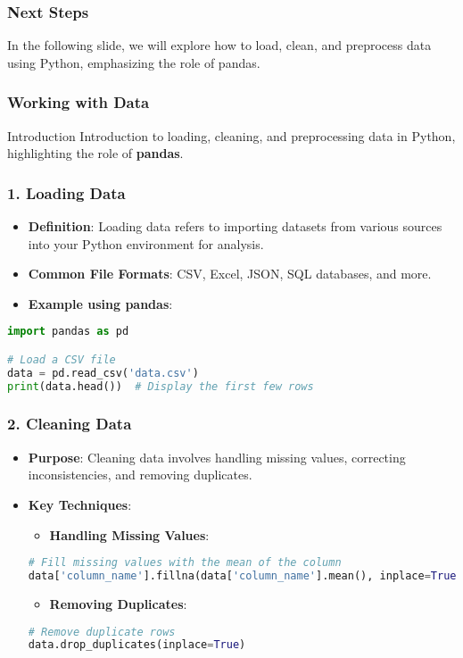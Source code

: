 \documentclass{beamer}
\begin{document}
\begin{frame}
    \frametitle{Next Steps}
    In the following slide, we will explore how to load, clean, and preprocess data using Python, emphasizing the role of pandas.
\end{frame}

\begin{frame}[fragile]
    \frametitle{Working with Data}
    \begin{block}{Introduction}
        Introduction to loading, cleaning, and preprocessing data in Python, highlighting the role of \textbf{pandas}.
    \end{block}
\end{frame}

\begin{frame}[fragile]
    \frametitle{1. Loading Data}
    \begin{itemize}
        \item \textbf{Definition}: Loading data refers to importing datasets from various sources into your Python environment for analysis.
        \item \textbf{Common File Formats}: CSV, Excel, JSON, SQL databases, and more.
        \item \textbf{Example using pandas}:
    \end{itemize}
    \begin{lstlisting}[language=Python]
import pandas as pd

# Load a CSV file
data = pd.read_csv('data.csv')
print(data.head())  # Display the first few rows
    \end{lstlisting}
\end{frame}

\begin{frame}[fragile]
    \frametitle{2. Cleaning Data}
    \begin{itemize}
        \item \textbf{Purpose}: Cleaning data involves handling missing values, correcting inconsistencies, and removing duplicates.
        \item \textbf{Key Techniques}:
        \begin{itemize}
            \item \textbf{Handling Missing Values}:
            \end{itemize}
            \begin{lstlisting}[language=Python]
# Fill missing values with the mean of the column
data['column_name'].fillna(data['column_name'].mean(), inplace=True)
            \end{lstlisting}

            \begin{itemize}
                \item \textbf{Removing Duplicates}:
            \end{itemize}
            \begin{lstlisting}[language=Python]
# Remove duplicate rows
data.drop_duplicates(inplace=True)
            \end{lstlisting}
    \end{itemize}
\end{frame}
\end{document}
